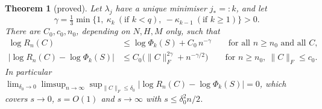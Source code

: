 \documentclass[11pt]{article}
\newtheorem{theorem}{Theorem}
\theoremstyle{remark}
\begin{document}
\begin{theorem}[proved]\label{thm:main}
Let $\lambda_j$ have a unique minimiser $j_*=:k$, and let
\begin{equation}
  \gamma=\tfrac13\min\{1,\ \kappa_k\ (\text{if }k<q),\ -\kappa_{k-1}\ (\text{if }k\ge1)\}>0.
  \label{eq:gamma}
\end{equation}
There are $C_0,c_0,n_0$, depending on $N,H,M$ only, such that
\begin{align}
  \log R_n(C)&\le\log\Phi_k(S)+C_0\,n^{-\gamma}\qquad\text{for all }n\ge n_0\text{ and all }C,\label{eq:upper}\\
  \big\lvert\log R_n(C)-\log\Phi_k(S)\big\rvert&\le C_0\big(\lVert C\rVert_F^{2\gamma}+n^{-\gamma/2}\big)\qquad\text{for }n\ge n_0,\ \lVert C\rVert_F\le c_0 .\label{eq:twosided}
\end{align}
In particular $\lim_{\delta_0\to0}\limsup_{n\to\infty}\sup_{\lVert C\rVert_F\le\delta_0}\lvert\log R_n(C)-\log\Phi_k(S)\rvert=0$, which covers $s\to0$, $s=O(1)$ and $s\to\infty$ with $s\le\delta_0^2n/2$.
\end{theorem}
\end{document}
